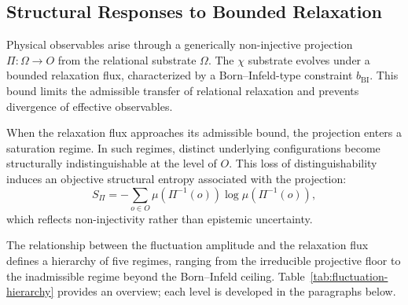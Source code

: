 \subsection{Structural Responses to Bounded Relaxation}
  \label{subsec:structural-interpretation-projective-thermodynamics}

  Physical observables arise through a generically non-injective projection
  $\Pi : \Omega \rightarrow O$ from the relational substrate $\Omega$.
  The $\chi$ substrate evolves under a bounded relaxation flux,
  characterized by a Born--Infeld-type constraint $b_{\mathrm{BI}}$.
  This bound limits the admissible transfer of relational relaxation
  and prevents divergence of effective observables.

  When the relaxation flux approaches its admissible bound,
  the projection enters a saturation regime.
  In such regimes, distinct underlying configurations
  become structurally indistinguishable at the level of $O$.
  This loss of distinguishability induces an objective structural entropy
  associated with the projection:
  \begin{equation}
    S_{\Pi} = -\sum_{o \in O}
    \mu(\Pi^{-1}(o)) \log \mu(\Pi^{-1}(o)),
  \end{equation}
  which reflects non-injectivity rather than epistemic uncertainty.

  The relationship between the fluctuation amplitude and the relaxation flux defines
  a hierarchy of five regimes, ranging from the irreducible projective floor to the
  inadmissible regime beyond the Born--Infeld ceiling.
  Table~\ref{tab:fluctuation-hierarchy} provides an overview; each level is developed
  in the paragraphs below.

